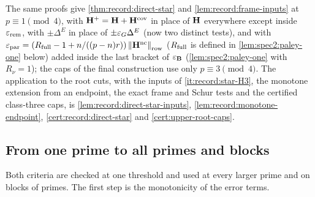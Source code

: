The same proofs give \cref{thm:record:direct-star} and \cref{lem:record:frame-inputs} at $p\equiv1\pmod4$, with
$\mathbf H^+=\mathbf H+\mathbf H^{\rm cov}$ in place of $\mathbf H$ everywhere except inside $\varepsilon_{\rm rem}$,
with $\pm\Delta^E$ in place of $\pm\varepsilon_G\Delta^E$ (now two distinct tests), and with
$\varepsilon_{\rm par}=(R_{\rm full}-1+n/((p-n)r))\left\|\mathbf H^{\rm nc}\right\|_{\rm row}$ ($R_{\rm full}$ is defined in \cref{lem:spec2:paley-one} below) added inside the last
bracket of $\varepsilon_{\mathbf B}$ (\cref{lem:spec2:paley-one} with $R_\nu=1$); the caps of the
final construction use only $p\equiv3\pmod4$. The application to the root
cuts, with the inputs of \ref{it:record:star-H3}, the monotone extension from an
endpoint, the exact frame and Schur tests and the certified class-three caps, is
\cref{lem:record:direct-star-inputs}, \cref{lem:record:monotone-endpoint},
\cref{cert:record:direct-star} and \cref{cert:upper-root-caps}.

\subsection{From one prime to all primes and blocks}\label{subsec:spec:thresholds}

Both criteria are checked at one threshold and used at every larger prime and on
blocks of primes. The first step is the monotonicity of the error terms.

